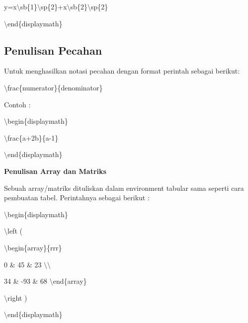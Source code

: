 y=x$\setminus$sb\{1\}$\setminus$sp\{2\}+x$\setminus$sb\{2\}$\setminus$sp\{2\}
\par \vspace{12pt}
$\setminus$end\{displaymath\}
\par \vspace{12pt}


\subsection {Penulisan Pecahan}
\par \vspace{12pt}
Untuk menghasilkan notasi pecahan dengan format perintah sebagai berikut:\par \vspace{12pt}

$\setminus$frac\{numerator\}\{denominator\}
\par \vspace{12pt}
Contoh :
\par \vspace{12pt}
$\setminus$begin\{displaymath\}
\par \vspace{12pt}
$\setminus$frac\{a+2b\}\{a-1\}
\par \vspace{12pt}
$\setminus$end\{displaymath\}
\par \vspace{12pt}


\textbf{Penulisan Array dan Matriks}
\par \vspace{12pt}
Sebuah array/matriks dituliskan dalam environment tabular sama seperti cara pembuatan tabel. Perintahnya sebagai berikut :
\par \vspace{12pt}
$\setminus$begin\{displaymath\}
\par \vspace{12pt}
$\setminus$left (
\par \vspace{12pt}
$\setminus$begin\{array\}\{rrr\}
\par \vspace{12pt}
0 \& 45 \& 23 $\setminus$$\setminus$
\par \vspace{12pt}
34 \& -93 \& 68 $\setminus$end\{array\}
\par \vspace{12pt}
$\setminus$right )
\par \vspace{12pt}
$\setminus$end\{displaymath\}
\par \vspace{12pt}


